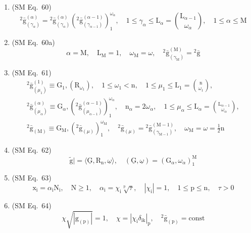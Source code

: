 \documentclass[12pt]{article}
\begin{document}
\begin{enumerate}[label=(\arabic*), series=formellist]
    \item (SM Eq.\ 60) 
    \[
    {}^2\bar{\mathrm{g}}_{(\gamma_\alpha)}^{(\alpha)} = {}^2\bar{\mathrm{g}}_{(\gamma_\alpha)}^{(\alpha)} \left( {}^2\bar{\mathrm{g}}_{(\gamma_{\alpha-1})}^{(\alpha-1)} \right)_1^{\omega_\alpha}, \quad 1 \le \gamma_\alpha \le \mathrm{L}_\alpha = \binom{\mathrm{L}_{\alpha-1}}{\omega_\alpha}, \quad 1 \le \alpha \le \mathrm{M}
    \]

    \item (SM Eq.\ 60a) 
    \[
    \alpha = \mathrm{M}, \quad \mathrm{L}_{\mathrm{M}} = 1, \quad \omega_{\mathrm{M}} = \omega, \quad {}^2\bar{\mathrm{g}}_{(\gamma_{\mathrm{M}})}^{(\mathrm{M})} = {}^2\bar{\mathrm{g}}
    \]

    \item (SM Eq.\ 61) 
    \[
    \begin{gathered}
    {}^2\bar{\mathrm{g}}_{(\mu_1)}^{(1)} \equiv \mathrm{G}_1, \left(\mathrm{R}_{\omega_1}\right), \quad 1 \le \omega_1 < \mathrm{n}, \quad 1 \le \mu_1 \le \mathrm{L}_1 = \binom{\mathrm{n}}{\omega_1}, \\
    {}^2\bar{\mathrm{g}}_{(\mu_\alpha)}^{(\alpha)} \equiv \mathrm{G}_\alpha, \left( {}^2\bar{\mathrm{g}}_{(\mu_{\alpha-1})}^{(\alpha-1)} \right)_1^{\omega_\alpha}, \quad \mathrm{n}_\alpha = 2\omega_\alpha, \quad 1 \le \mu_\alpha \le \mathrm{L}_\alpha = \binom{\mathrm{L}_{\alpha-1}}{\omega_\alpha}, \\
    {}^2\bar{\mathrm{g}}_{(\mathrm{M})} \equiv \mathrm{G}_{\mathrm{M}}, \left( {}^2\bar{\mathrm{g}}_{(\mu)} \right)_1^{\omega_{\mathrm{M}}}, \quad {}^2\bar{\mathrm{g}}_{(\mu)} = {}^2\bar{\mathrm{g}}_{(\gamma_{\mathrm{M}-1})}^{(\mathrm{M}-1)}, \quad \omega_{\mathrm{M}} = \omega = \frac{1}{2}\mathrm{n}
    \end{gathered}
    \]

    \item (SM Eq.\ 62) 
    \[
    \tilde{\mathrm{g}}| = \langle \underline{\mathrm{G}}, \mathrm{R}_{\mathrm{n}}, \underline{\omega} \rangle, \quad (\underline{\mathrm{G}}, \underline{\omega}) = \left(\mathrm{G}_\alpha, \omega_\alpha\right)_1^{\mathrm{M}}
    \]

    \item (SM Eq.\ 63) 
    \[
    \mathrm{x_i} = \alpha_\mathrm{i} \mathrm{N_i}, \quad \mathrm{N} \ge 1, \quad \alpha_\mathrm{i} = \chi_\mathrm{i} \sqrt[\mathrm{p}]{\tau}, \quad |\chi_\mathrm{i}| = 1, \quad 1 \le \mathrm{p} \le \mathrm{n}, \quad \tau > 0
    \]

    \item (SM Eq.\ 64) 
    \[
    \chi \sqrt{|\mathrm{g}_{(\mathrm{p})}|} = 1, \quad \chi = |\chi_\mathrm{i} \delta_{\mathrm{ik}}|_\mathrm{p}, \quad {}^2\bar{\mathrm{g}}_{(\mathrm{p})} = \mathrm{const}
    \]


\end{enumerate}
\end{document}
